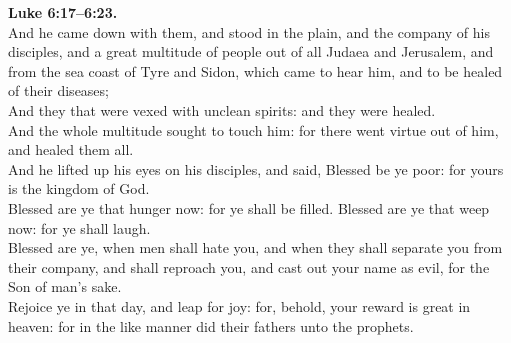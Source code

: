 \documentclass[10pt]{article} %
\begin{document}
{\begin{minipage}[t]{0.45\textwidth}
\textbf{Luke 6:17--6:23.}\\
And he came down with them, and stood in the plain, and the company of his disciples, and a great multitude of people out of all Judaea and Jerusalem, and from the sea coast of Tyre and Sidon, which came to hear him, and to be healed of their diseases;\\
And they that were vexed with unclean spirits: and they were healed.\\
And the whole multitude sought to touch him: for there went virtue out of him, and healed them all.\\
And he lifted up his eyes on his disciples, and said, Blessed be ye poor: for yours is the kingdom of God.\\
Blessed are ye that hunger now: for ye shall be filled. Blessed are ye that weep now: for ye shall laugh.\\
Blessed are ye, when men shall hate you, and when they shall separate you from their company, and shall reproach you, and cast out your name as evil, for the Son of man's sake.\\
Rejoice ye in that day, and leap for joy: for, behold, your reward is great in heaven: for in the like manner did their fathers unto the prophets.\\

\end{minipage}}
\vspace*{\fill}
\newpage
\huge%
\vspace*{\fill}
\begin{spacing}{1.0}
\end{spacing}
\vspace*{\fill}
\end{document}
